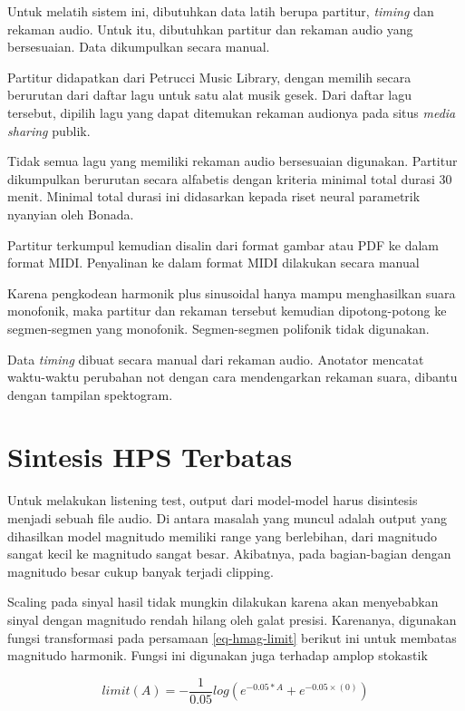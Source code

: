 Untuk melatih sistem ini, dibutuhkan data latih berupa partitur, \textit{timing} dan rekaman audio. Untuk itu, dibutuhkan partitur dan rekaman audio yang bersesuaian. Data dikumpulkan secara manual.

Partitur didapatkan dari Petrucci Music Library, dengan memilih secara berurutan dari daftar lagu untuk satu alat musik gesek. Dari daftar lagu tersebut, dipilih lagu yang dapat ditemukan rekaman audionya pada situs \textit{media sharing} publik.

Tidak semua lagu yang memiliki rekaman audio bersesuaian digunakan. Partitur dikumpulkan berurutan secara alfabetis dengan kriteria minimal total durasi 30 menit. Minimal total durasi ini didasarkan kepada riset neural parametrik nyanyian oleh Bonada.

Partitur terkumpul kemudian disalin dari format gambar atau PDF ke dalam format MIDI. Penyalinan ke dalam format MIDI dilakukan secara manual

Karena pengkodean harmonik plus sinusoidal hanya mampu menghasilkan suara monofonik, maka partitur dan rekaman tersebut kemudian dipotong-potong ke segmen-segmen yang monofonik. Segmen-segmen polifonik tidak digunakan.

Data \textit{timing} dibuat secara manual dari rekaman audio. Anotator mencatat waktu-waktu perubahan not dengan cara mendengarkan rekaman suara, dibantu dengan tampilan spektogram.

\section{Sintesis HPS Terbatas}

Untuk melakukan listening test, output dari model-model harus disintesis menjadi sebuah file audio. Di antara masalah yang muncul adalah output yang dihasilkan model magnitudo memiliki range yang berlebihan, dari magnitudo sangat kecil ke magnitudo sangat besar. Akibatnya, pada bagian-bagian dengan magnitudo besar cukup banyak terjadi clipping.

Scaling pada sinyal hasil tidak mungkin dilakukan karena akan menyebabkan sinyal dengan magnitudo rendah hilang oleh galat presisi. Karenanya, digunakan fungsi transformasi pada persamaan \ref{eq-hmag-limit} berikut ini untuk membatas magnitudo harmonik. Fungsi ini digunakan juga terhadap amplop stokastik

\begin{equation}
    limit(A) = -\dfrac{1}{0.05} log(e^{-0.05*A}+e^{-0.05\times(0)})
\end{equation}\label{eq-hmag-limit}


